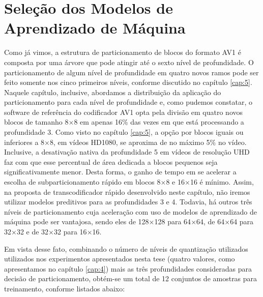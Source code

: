 \section{Seleção dos Modelos de Aprendizado de Máquina}
\label{cap:7.3}

Como já vimos, a estrutura de particionamento de blocos do formato AV1 é composta por uma árvore que pode atingir até o sexto nível de profundidade. O particionamento de algum nível de profundidade em quatro novos ramos pode ser feito somente nos cinco primeiros níveis, conforme discutido no capítulo \ref{cap:5}. Naquele capítulo, inclusive, abordamos a distribuição da aplicação do particionamento para cada nível de profundidade e, como pudemos constatar, o software de referência do codificador AV1 opta pela divisão em quatro novos blocos de tamanho 8$\times$8 em apenas 16\% das vezes em que está processando a profundidade 3. Como visto no capítulo \ref{cap:5}, a opção por blocos iguais ou inferiores a 8$\times$8, em vídeos HD1080, se aproxima de no máximo 5\% no vídeo. Inclusive, a desativação nativa da profundidade 5 em vídeos de resolução UHD faz com que esse percentual de área dedicada a blocos pequenos seja significativamente menor. Desta forma, o ganho de tempo em se acelerar a escolha de subparticionamento rápido em blocos 8$\times$8 e 16$\times$16 é mínimo. Assim, na proposta de transcodificador rápido desenvolvido neste capítulo, não iremos utilizar modelos preditivos para as profundidades 3 e 4. Todavia, há outros três níveis de particionamento cuja aceleração com uso de modelos de aprendizado de máquina pode ser vantajosa, sendo eles de 128$\times$128 para 64$\times$64, de 64$\times$64 para 32$\times$32 e de 32$\times$32 para 16$\times$16.

Em vista desse fato, combinando o número de níveis de quantização utilizados utilizados nos experimentos apresentados nesta tese (quatro valores, como apresentamos no capítulo \ref{cap:4}) mais as três profundidades consideradas para decisão de particionamento, obtém-se um total de 12 conjuntos de amostras para treinamento, conforme listados abaixo:

